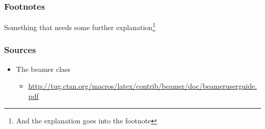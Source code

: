 \documentclass{beamer}
\begin{document}
\begin{frame}
    \frametitle{Footnotes}

    Something that needs some further explanation\footnote{And the explanation goes into the footnote}
\end{frame}

\begin{frame}
  \frametitle{Sources}

  \begin{itemize}
    \item The beamer class
    \begin{itemize}
      \item \url{http://tug.ctan.org/macros/latex/contrib/beamer/doc/beameruserguide.pdf}
    \end{itemize}
  \end{itemize}

\end{frame}
\end{document}
